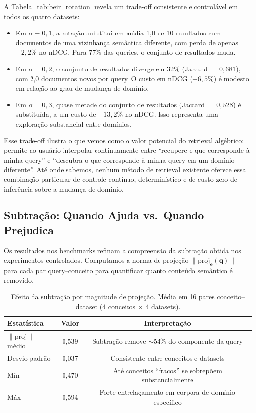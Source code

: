 \documentclass{article}
\begin{document}
A Tabela~\ref{tab:beir_rotation} revela um trade-off consistente e controlável em todos os quatro datasets:

\begin{itemize}
\item Em $\alpha = 0{,}1$, a rotação substitui em média 1,0 de 10 resultados com documentos de uma vizinhança semântica diferente, com perda de apenas $-2{,}2\%$ no nDCG. Para 77\% das queries, o conjunto de resultados muda.

\item Em $\alpha = 0{,}2$, o conjunto de resultados diverge em 32\% (Jaccard $= 0{,}681$), com 2,0 documentos novos por query. O custo em nDCG ($-6{,}5\%$) é modesto em relação ao grau de mudança de domínio.

\item Em $\alpha = 0{,}3$, quase metade do conjunto de resultados (Jaccard $= 0{,}528$) é substituída, a um custo de $-13{,}2\%$ no nDCG. Isso representa uma exploração substancial entre domínios.
\end{itemize}

Esse trade-off ilustra o que vemos como o valor potencial do retrieval algébrico: permite ao usuário interpolar continuamente entre ``recupere o que corresponde à minha query'' e ``descubra o que corresponde à minha query em um domínio diferente''. Até onde sabemos, nenhum método de retrieval existente oferece essa combinação particular de controle contínuo, determinístico e de custo zero de inferência sobre a mudança de domínio.

\subsection{Subtração: Quando Ajuda vs.\ Quando Prejudica}

Os resultados nos benchmarks refinam a compreensão da subtração obtida nos experimentos controlados. Computamos a norma de projeção $\|\text{proj}_\mathbf{e}(\mathbf{q})\|$ para cada par query--conceito para quantificar quanto conteúdo semântico é removido.

\begin{table}[ht]
\centering
\caption{Efeito da subtração por magnitude de projeção. Média em 16 pares conceito--dataset (4 conceitos $\times$ 4 datasets).}
\label{tab:beir_proj}
\begin{tabular}{lcc}
\toprule
Estatística & Valor & Interpretação \\
\midrule
$\|\text{proj}\|$ médio & 0,539 & Subtração remove $\sim$54\% do componente da query \\
Desvio padrão & 0,037 & Consistente entre conceitos e datasets \\
Mín & 0,470 & Até conceitos ``fracos'' se sobrepõem substancialmente \\
Máx & 0,594 & Forte entrelaçamento em corpora de domínio específico \\
\bottomrule
\end{tabular}
\end{table}
\end{document}
